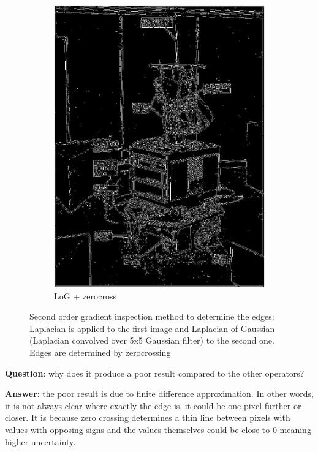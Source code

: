 \documentclass[lettersize,journal]{IEEEtran}
\begin{document}
\begin{figure}[h]
\begin{subfigure}[h]{0.23\textwidth}
        \includegraphics[width=\linewidth]{log_zerocross}
        \caption{LoG + zerocross}  
    \end{subfigure}
    \caption{Second order gradient inspection method to determine the edges: Laplacian is applied to the first image and Laplacian of Gaussian (Laplacian convolved over 5x5 Gaussian filter) to the second one. Edges are determined by zerocrossing}
    \label{fig:7}
\end{figure}

\noindent\textbf{Question}: why does it produce a poor result compared to the other operators?

\hfill

\noindent\textbf{Answer}: the poor result is due to finite difference approximation. In other words, it is not always clear where exactly the edge is, it could be one pixel further or closer. It is because zero crossing determines a thin line between pixels with values with opposing signs and the values themselves could be close to 0 meaning higher uncertainty.
\end{document}
